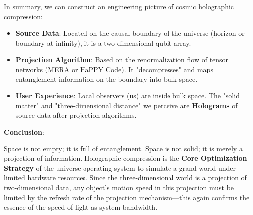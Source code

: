 In summary, we can construct an engineering picture of cosmic holographic compression:

\begin{itemize}
\item \textbf{Source Data}: Located on the causal boundary of the universe (horizon or boundary at infinity), it is a two-dimensional qubit array.

\item \textbf{Projection Algorithm}: Based on the renormalization flow of tensor networks (MERA or HaPPY Code). It "decompresses" and maps entanglement information on the boundary into bulk space.

\item \textbf{User Experience}: Local observers (us) are inside bulk space. The "solid matter" and "three-dimensional distance" we perceive are \textbf{Holograms} of source data after projection algorithms.
\end{itemize}

\textbf{Conclusion}:

Space is not empty; it is full of entanglement. Space is not solid; it is merely a projection of information. Holographic compression is the \textbf{Core Optimization Strategy} of the universe operating system to simulate a grand world under limited hardware resources. Since the three-dimensional world is a projection of two-dimensional data, any object's motion speed in this projection must be limited by the refresh rate of the projection mechanism—this again confirms the essence of the speed of light as system bandwidth.
